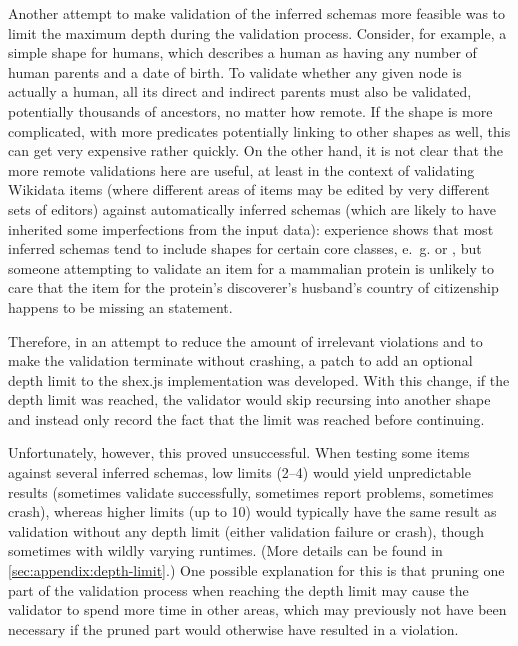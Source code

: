 Another attempt to make validation of the inferred \glspl{schema} more feasible
was to limit the maximum depth during the validation process.
Consider, for example, a simple \gls{shape} for humans, %
which describes a human as having any number of human parents and a date of birth.
To validate whether any given node is actually a human,
all its direct and indirect parents must also be validated,
potentially thousands of ancestors, no matter how remote.
If the \gls{shape} is more complicated,
with more predicates potentially linking to other \glspl{shape} as well,
this can get very expensive rather quickly.
On the other hand, it is not clear that the more remote validations here are useful,
at least in the context of validating \gls{Wikidata} \glspl{item}
(where different areas of \glspl{item} may be edited by very different sets of editors)
against automatically inferred \glspl{schema}
(which are likely to have inherited some imperfections from the input data):
experience shows that %
most inferred \glspl{schema} tend to include \glspl{shape} for certain core classes,
e.~g.  or ,
but someone attempting to validate an \gls{item} for a mammalian protein
is unlikely to care that the \gls{item} for the protein’s discoverer’s husband’s country of citizenship
happens to be missing an  statement.

Therefore, in an attempt to reduce the amount of irrelevant violations
and to make the validation terminate without crashing,
a patch to add an optional depth limit to the shex.js implementation was developed.
With this change, if the depth limit was reached,
the validator would skip recursing into another \gls{shape}
and instead only record the fact that the limit was reached before continuing.

Unfortunately, however, this proved unsuccessful.
When testing some \glspl{item} against several inferred \glspl{schema},
low limits (2–4) would yield unpredictable results
(sometimes validate successfully, sometimes report problems, sometimes crash),
whereas higher limits (up to 10) would typically have the same result as validation without any depth limit
(either validation failure or crash),
though sometimes with wildly varying runtimes.
(More details can be found in \cref{sec:appendix:depth-limit}.)
One possible explanation for this is that pruning one part of the validation process when reaching the depth limit
may cause the validator to spend more time in other areas,
which may previously not have been necessary if the pruned part would otherwise have resulted in a violation.

